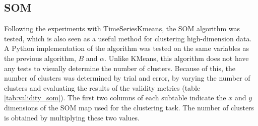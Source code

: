 \subsection{SOM}\label{sec:som_experiments}
Following the experiments with TimeSeriesKmeans, the SOM algorithm was tested, which is also seen as a useful method for clustering high-dimension data. A Python implementation of the algorithm \cite{vettigliminisom} was tested on the same variables as the previous algorithm, $B$ and $\alpha$. Unlike KMeans, this algorithm does not have any tests to visually determine the number of clusters. Because of this, the number of clusters was determined by trial and error, by varying the number of clusters and evaluating the results of the validity metrics (table \ref{tab:validity_som}). The first two columns of each subtable indicate the $x$ and $y$ dimensions of the SOM map used for the clustering task. The number of clusters is obtained by multiplying these two values.

